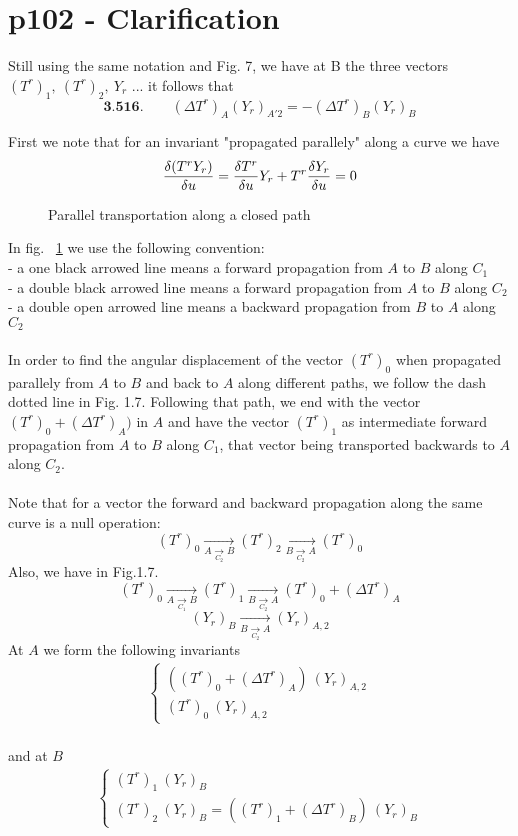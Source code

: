 \section{p102 - Clarification}
\begin{tcolorbox}
Still using the same notation and Fig. 7, we have at B the three vectors $(T^r)_1,\ (T^r)_2,\ Y_r$ ...  it follows that $$\textbf{3.516.}\quad \quad (\Delta T^r)_A(Y_r)_{A'2}= - (\Delta T^r)_B(Y_r)_B$$
\end{tcolorbox}
First we note that for an invariant "propagated parallely" along a curve we have $$\fdv{(T^r Y_r)}{u} = \fdv{T^r} {u}Y_r+T^r\fdv{Y_r}{u}=0$$
\begin{figure}[h]

\caption{Parallel transportation along a  closed path}
\label{fig:fig_p102_3516_a}
\end{figure}
In fig. ~\ref{fig:fig_p102_3516_a} we use the following convention:\\
- a one black arrowed line means a forward propagation from $A$ to $B$ along $C_1$\\
- a double black arrowed line means a forward propagation from $A$ to $B$ along $C_2$\\
- a double open arrowed line means a backward propagation from $B$ to $A$ along $C_2$\\\\
In order to find the angular displacement of the vector $(T^r)_0$ when propagated parallely from $A$ to $B$ and back to $A$ along different paths, we follow  the dash dotted line in Fig. 1.7. Following that path, we end with the vector $(T^r)_0+ (\Delta T^r)_{A})$ in $A$ and have the vector $(T^r)_1$ as intermediate forward propagation from $A$ to $B$ along $C_1$, that vector being transported backwards to $A$ along $C_2$.\\\\
Note that for a vector the forward and backward propagation along the same curve is a null operation:$$(T^r)_0 \underset{\underset{C_2}{A\rightarrow B}}{\rightarrow} (T^r)_2 \underset{\underset{C_2}{B\rightarrow A}}{\rightarrow} (T^r)_0$$
Also, we have in Fig.1.7.
$$(T^r)_0 \underset{\underset{C_1}{A\rightarrow B}}{\rightarrow} (T^r)_1 \underset{\underset{C_2}{B\rightarrow A}}{\rightarrow} (T^r)_0+ (\Delta T^r)_{A}$$
$$(Y_r)_{B} \underset{\underset{C_2}{B\rightarrow A}}{\rightarrow} (Y_r)_{A,2}$$
At $A$ we form the following invariants
\begin{align}
\left \{ \begin{array}{l}
 ((T^r)_0+ (\Delta T^r)_{A})\ (Y_r)_{A,2}\\
 (T^r)_0 \ (Y_r)_{A,2}
\end{array} \right.
\end{align}\\
and at $B$
\begin{align}
\left \{ \begin{array}{l}
 (T^r)_1\ (Y_r)_{B}\\
 (T^r)_2 \ (Y_r)_{B} = ((T^r)_1+(\Delta T^r)_B )\ (Y_r)_{B}
\end{array} \right.
\end{align}\\

